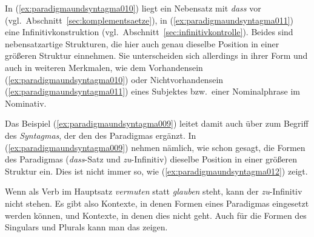 \begin{exe}
  \ex\label{ex:paradigmaundsyntagma009}
  \begin{xlist}
  \end{xlist}
\end{exe}

In (\ref{ex:paradigmaundsyntagma010}) liegt ein Nebensatz mit \textit{dass} vor (vgl.\ Abschnitt~\ref{sec:komplementsaetze}), in (\ref{ex:paradigmaundsyntagma011}) eine Infinitivkonstruktion (vgl.\ Abschnitt~\ref{sec:infinitivkontrolle}).
Beides sind nebensatzartige Strukturen, die hier auch genau dieselbe Position in einer größeren Struktur einnehmen.
Sie unterscheiden sich allerdings in ihrer Form und auch in weiteren Merkmalen, wie \zB dem Vorhandensein (\ref{ex:paradigmaundsyntagma010}) oder Nichtvorhandensein (\ref{ex:paradigmaundsyntagma011}) eines Subjektes bzw.\ einer Nominalphrase im Nominativ.

Das Beispiel (\ref{ex:paradigmaundsyntagma009}) leitet damit auch über zum Begriff des \textit{Syntagmas}, der den des Paradigmas ergänzt.
In (\ref{ex:paradigmaundsyntagma009}) nehmen nämlich, wie schon gesagt, die Formen des Paradigmas (\textit{dass}-Satz und \textit{zu}-Infinitiv) dieselbe Position in einer größeren Struktur ein.
Dies ist nicht immer so, wie (\ref{ex:paradigmaundsyntagma012}) zeigt.

\begin{exe}
  \ex\label{ex:paradigmaundsyntagma012}
  \begin{xlist}
  \end{xlist}
\end{exe}

Wenn als Verb im Hauptsatz \textit{vermuten} statt \textit{glauben} steht, kann der \textit{zu}-Infinitiv nicht stehen.
Es gibt also Kontexte, in denen Formen eines Paradigmas eingesetzt werden können, und Kontexte, in denen dies nicht geht.
Auch für die Formen des Singulars und Plurals kann man das zeigen.

\begin{exe}
  \ex\label{ex:paradigmaundsyntagma015}
  \begin{xlist}
  \end{xlist}
\end{exe}

